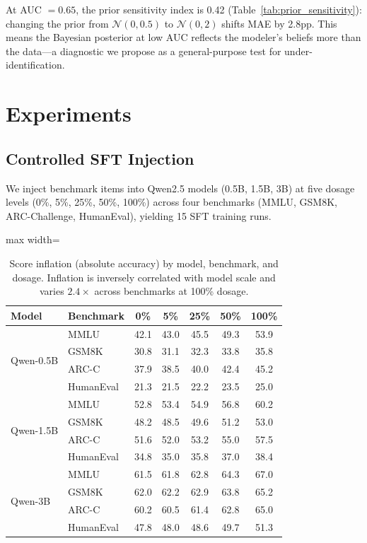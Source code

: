 \documentclass[letterpaper,11pt]{article}
\begin{document}
At AUC $= 0.65$, the prior sensitivity index is 0.42 (Table~\ref{tab:prior_sensitivity}): changing the prior from $\mathcal{N}(0,0.5)$ to $\mathcal{N}(0,2)$ shifts MAE by 2.8pp.
This means the Bayesian posterior at low AUC reflects the modeler's beliefs more than the data---a diagnostic we propose as a general-purpose test for under-identification.

\section{Experiments}

\subsection{Controlled SFT Injection}
\label{sec:sft_injection}

We inject benchmark items into Qwen2.5 models (0.5B, 1.5B, 3B) at five dosage levels (0\%, 5\%, 25\%, 50\%, 100\%) across four benchmarks (MMLU, GSM8K, ARC-Challenge, HumanEval), yielding 15 SFT training runs.

\begin{table}[t]
\centering
\caption{Score inflation (absolute accuracy) by model, benchmark, and dosage. Inflation is inversely correlated with model scale and varies $2.4\times$ across benchmarks at 100\% dosage.}
\label{tab:inflation}
\begin{adjustbox}{max width=\columnwidth}
\begin{tabular}{@{}llccccc@{}}
\toprule
Model & Benchmark & 0\% & 5\% & 25\% & 50\% & 100\% \\
\midrule
\multirow{4}{*}{Qwen-0.5B}
 & MMLU & 42.1 & 43.0 & 45.5 & 49.3 & 53.9 \\
 & GSM8K & 30.8 & 31.1 & 32.3 & 33.8 & 35.8 \\
 & ARC-C & 37.9 & 38.5 & 40.0 & 42.4 & 45.2 \\
 & HumanEval & 21.3 & 21.5 & 22.2 & 23.5 & 25.0 \\
\midrule
\multirow{4}{*}{Qwen-1.5B}
 & MMLU & 52.8 & 53.4 & 54.9 & 56.8 & 60.2 \\
 & GSM8K & 48.2 & 48.5 & 49.6 & 51.2 & 53.0 \\
 & ARC-C & 51.6 & 52.0 & 53.2 & 55.0 & 57.5 \\
 & HumanEval & 34.8 & 35.0 & 35.8 & 37.0 & 38.4 \\
\midrule
\multirow{4}{*}{Qwen-3B}
 & MMLU & 61.5 & 61.8 & 62.8 & 64.3 & 67.0 \\
 & GSM8K & 62.0 & 62.2 & 62.9 & 63.8 & 65.2 \\
 & ARC-C & 60.2 & 60.5 & 61.4 & 62.8 & 65.0 \\
 & HumanEval & 47.8 & 48.0 & 48.6 & 49.7 & 51.3 \\
\bottomrule
\end{tabular}
\end{adjustbox}
\end{table}
\end{document}
